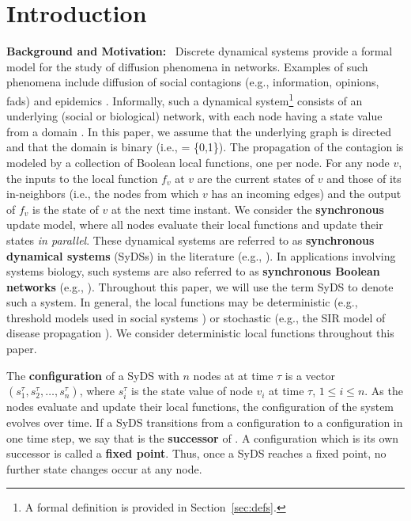 \section{Introduction}
\label{sec:intro}



\smallskip

\textbf{Background and Motivation:}~
Discrete dynamical systems provide a formal model
for the study of diffusion phenomena in networks.
Examples of such phenomena include diffusion of social contagions
(e.g., information, opinions, fads) and epidemics
\cite{Adiga-etal-2019,Chistikov-etal-2020,OU-2020}.
Informally, such a dynamical system\footnote{A formal definition
is provided in Section~\ref{sec:defs}.}
consists of an underlying (social or biological) network, with each node having a
state value from a domain \bbb.
In this paper, we assume that the underlying
graph is directed and that the domain is binary (i.e., \bbb{} = \{0,1\}).
The propagation of the contagion is modeled by a collection
of Boolean local functions, one per node.
For any node $v$, the inputs to the local function $f_v$ at $v$
are the current states of $v$ and those of its in-neighbors (i.e., the nodes
from which $v$ has an incoming edges) and the output of $f_v$
is the state of $v$ at the next time instant.
We consider the \textbf{synchronous} update model, where all
nodes evaluate their local functions and update their states
\emph{in parallel}.
These dynamical systems are referred to
as \textbf{synchronous dynamical systems} (SyDSs) in
the literature (e.g., \cite{Adiga-etal-2019,Rosenkrantz-etal-2018}).
In applications involving systems biology, such systems are also
referred to as \textbf{synchronous Boolean networks}
(e.g., \cite{Kauffman-etal-2003,OU-2020,Akutsu-etal-2007}).
Throughout this paper, we will use the term SyDS to denote such a system.
In general, the local functions may be deterministic (e.g., threshold models
used in social systems \cite{granovetter-1978}) or stochastic
(e.g., the SIR model of disease propagation \cite{Easley-Kleinberg-2010}).
We consider deterministic local functions throughout this paper.

The \textbf{configuration} of a SyDS with $n$ nodes at at time $\tau$ is a
vector $(s_1^{\tau}, s_2^{\tau}, \ldots, s_n^{\tau})$, where $s_i^{\tau}$
is the state value of node $v_i$ at time $\tau$, $1 \leq i \leq n$.
As the nodes evaluate and update their local functions, the configuration
of the system evolves over time.
If a SyDS transitions from a configuration \calc{} to a configuration \calcp{}
in one time step, we say that \calcp{} is the \textbf{successor} of \calc. 
A configuration \calc{} which is its own successor is called a
\textbf{fixed point}.
Thus, once a SyDS reaches a fixed point, no further state changes
occur at any node.

